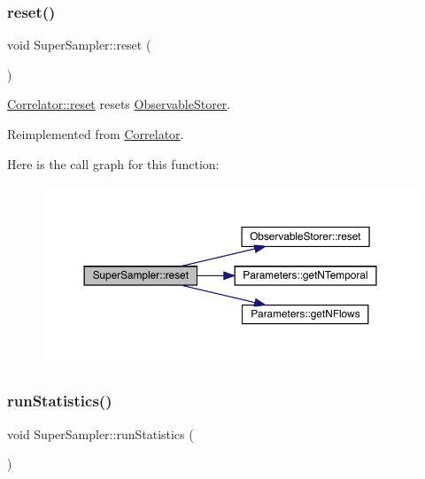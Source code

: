 \subsubsection{\texorpdfstring{reset()}{reset()}}
{\footnotesize\ttfamily void Super\+Sampler\+::reset (\begin{DoxyParamCaption}{ }\end{DoxyParamCaption})\hspace{0.3cm}{\ttfamily [virtual]}}



\mbox{\hyperlink{class_correlator_aacca40262d2cd62f0a3964e832f948c1}{Correlator\+::reset}} resets \mbox{\hyperlink{class_observable_storer}{Observable\+Storer}}. 



Reimplemented from \mbox{\hyperlink{class_correlator_aacca40262d2cd62f0a3964e832f948c1}{Correlator}}.

Here is the call graph for this function\+:
\nopagebreak
\begin{figure}[H]
\begin{center}
\leavevmode
\includegraphics[width=350pt]{class_super_sampler_ab2f028561e015500fac1e3093aa4a725_cgraph}
\end{center}
\end{figure}
\mbox{\label{class_super_sampler_af96f7d461e9159adb4eef9bda9c6ecde}} 
\subsubsection{\texorpdfstring{runStatistics()}{runStatistics()}}
{\footnotesize\ttfamily void Super\+Sampler\+::run\+Statistics (\begin{DoxyParamCaption}{ }\end{DoxyParamCaption})\hspace{0.3cm}{\ttfamily [virtual]}}




